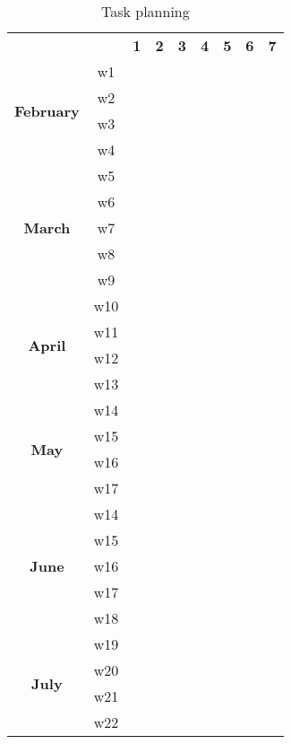 \renewcommand{\arraystretch}{0.9}
\begin{table}[h]
    \begin{center}
        \begin{tabular}{ c c c c c c c c c }
        && \textbf{1} & \textbf{2} & \textbf{3} & \textbf{4} & \textbf{5} & \textbf{6} & \textbf{7} \\ 
        \multirow{4}{*}{\textbf{February}} & w1 & \cellcolor{yellow!70!lime} \\ & w2 & \cellcolor{yellow!70!lime} \\ & w3 & \cellcolor{yellow!60!lime} \\ & w4 & \cellcolor{yellow!60!lime} \\ 
        \multirow{5}{*}{\textbf{March}} & w5 && \cellcolor{yellow!70!lime} \\ & w6 && \cellcolor{yellow!70!lime} \\ & w7 && \cellcolor{yellow!60!lime} \\ & w8 && \cellcolor{yellow!60!lime} \\ & w9 && \cellcolor{yellow!60!lime} \\ 
        \multirow{4}{*}{\textbf{April}} & w10 &&& \cellcolor{yellow!70!lime} \\ & w11 &&& \cellcolor{yellow!70!lime} \\ & w12 &&& \cellcolor{yellow!60!lime} \\ & w13 &&& \cellcolor{yellow!60!lime} \\ 
        \multirow{4}{*}{\textbf{May}} & w14 &&&& \cellcolor{yellow!70!lime} \\ & w15 &&&& \cellcolor{yellow!70!lime} \\ & w16 &&&& \cellcolor{yellow!60!lime} \\ & w17 &&&& \cellcolor{yellow!60!lime} \\ 
        \multirow{5}{*}{\textbf{June}} & w14 &&&&& \cellcolor{yellow!70!lime} \\ & w15 &&&&& \cellcolor{yellow!70!lime} \\ & w16 &&&&& \cellcolor{yellow!60!lime} \\ & w17 &&&&& \cellcolor{yellow!60!lime} \\ & w18 &&&&& \cellcolor{yellow!60!lime} \\ 
        \multirow{4}{*}{\textbf{July}} & w19 &&&&&& \cellcolor{yellow!70!lime} \\ & w20 &&&&&& \cellcolor{yellow!70!lime} \\ & w21 &&&&&& \cellcolor{yellow!60!lime} \\ & w22 &&&&&& \cellcolor{yellow!60!lime} \\ 
        \end{tabular}
    \end{center}
    \caption{Task planning}
    \label{tab:planning}
\end{table}